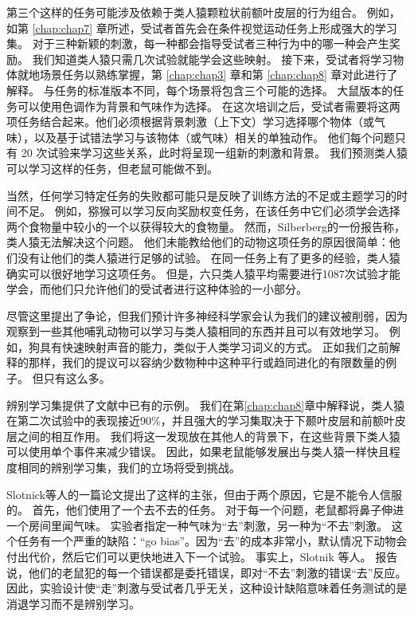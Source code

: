第三个这样的任务可能涉及依赖于类人猿颗粒状前额叶皮层的行为组合。
例如，如第 \ref{chap:chap7} 章所述，受试者首先会在条件视觉运动任务上形成强大的学习集。
对于三种新颖的刺激，每一种都会指导受试者三种行为中的哪一种会产生奖励。
我们知道类人猿只需几次试验就能学会这些映射。
接下来，受试者将学习物体就地场景任务以熟练掌握，第 \ref{chap:chap3} 章和第 \ref{chap:chap8} 章对此进行了解释。
与任务的标准版本不同，每个场景将包含三个可能的选择。
大鼠版本的任务可以使用色调作为背景和气味作为选择。
在这次培训之后，受试者需要将这两项任务结合起来。他们必须根据背景刺激（上下文）学习选择哪个物体（或气味），以及基于试错法学习与该物体（或气味）相关的单独动作。
他们每个问题只有 20 次试验来学习这些关系，此时将呈现一组新的刺激和背景。
我们预测类人猿可以学习这样的任务，但老鼠可能做不到。
\par


当然，任何学习特定任务的失败都可能只是反映了训练方法的不足或主题学习的时间不足。
例如，猕猴可以学习反向奖励权变任务，在该任务中它们必须学会选择两个食物量中较小的一个以获得较大的食物量\cite{murray2005learning}。
然而，Silberberg\cite{silberberg1996pointing}的一份报告称，类人猿无法解决这个问题。
他们未能教给他们的动物这项任务的原因很简单：他们没有让他们的类人猿进行足够的试验。
在同一任务上有了更多的经验，类人猿确实可以很好地学习这项任务。
但是，六只类人猿平均需要进行1087次试验才能学会，而他们只允许他们的受试者进行这种体验的一小部分。
\par


尽管这里提出了争论，但我们预计许多神经科学家会认为我们的建议被削弱，因为观察到一些其他哺乳动物可以学习与类人猿相同的东西并且可以有效地学习。
例如，狗具有快速映射声音的能力，类似于人类学习词义的方式\cite{kaminski2004word}。
正如我们之前解释的那样，我们的提议可以容纳少数物种中这种平行或趋同进化的有限数量的例子。
但只有这么多。
\par


辨别学习集提供了文献中已有的示例。
我们在第\ref{chap:chap8}章中解释说，类人猿在第二次试验中的表现接近90$\%$，并且强大的学习集取决于下颞叶皮层和前额叶皮层之间的相互作用。
我们将这一发现放在其他人的背景下，在这些背景下类人猿可以使用单个事件来减少错误。
因此，如果老鼠能够发展出与类人猿一样快且程度相同的辨别学习集，我们的立场将受到挑战。
\par


Slotnick等人的一篇论文\cite{slotnick2000can}提出了这样的主张，但由于两个原因，它是不能令人信服的。
首先，他们使用了一个去不去的任务。
对于每一个问题，老鼠都将鼻子伸进一个房间里闻气味。
实验者指定一种气味为“去”刺激，另一种为“不去”刺激。
这个任务有一个严重的缺陷：“go bias”。因为“去”的成本非常小，默认情况下动物会付出代价，然后它们可以更快地进入下一个试验。
事实上，Slotnik 等人。
报告说，他们的老鼠犯的每一个错误都是委托错误，即对“不去”刺激的错误“去”反应。
因此，实验设计使“走”刺激与受试者几乎无关，这种设计缺陷意味着任务测试的是消退学习而不是辨别学习。
\par


